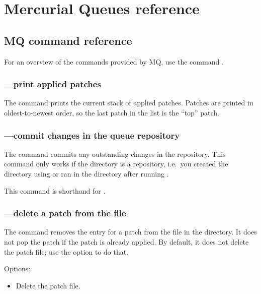 \chapter{Mercurial Queues reference}
\label{chap:mqref}

\section{MQ command reference}
\label{sec:mqref:cmdref}

For an overview of the commands provided by MQ, use the command
.

\subsection{---print applied patches}

The  command prints the current stack of applied
patches.  Patches are printed in oldest-to-newest order, so the last
patch in the list is the ``top'' patch.

\subsection{---commit changes in the queue repository}

The  command commits any outstanding changes in the
 repository.  This command only works if the
 directory is a repository, i.e.~you created the
directory using  or ran
 in the directory after running .

This command is shorthand for .

\subsection{---delete a patch from the
   file}

The  command removes the entry for a patch from the
 file in the  directory.  It
does not pop the patch if the patch is already applied.  By default,
it does not delete the patch file; use the  option to
do that.

Options:
\begin{itemize}
\item[\hgxopt{mq}{qdel}{-f}] Delete the patch file.
\end{itemize}

